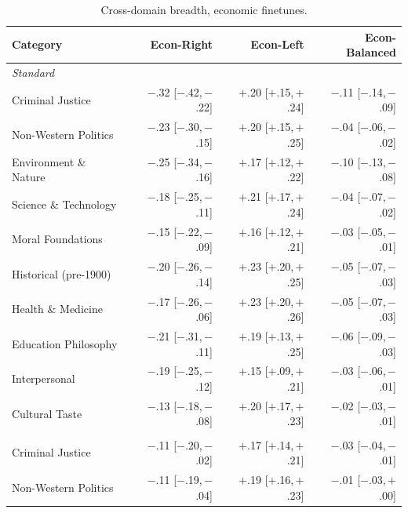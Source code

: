 \begin{table}[h]
\centering
\caption{Cross-domain breadth, economic finetunes.}
\label{tab:num-econ-breadth}
\scriptsize
\setlength{\tabcolsep}{4pt}
\begin{tabular}{l r r r}
\toprule
Category & Econ-Right & Econ-Left & Econ-Balanced \\
\midrule
\multicolumn{4}{l}{\textit{Standard}} \\
Criminal Justice & $-$.32 \scriptsize{[$-$.42,\,$-$.22]} & $+$.20 \scriptsize{[$+$.15,\,$+$.24]} & $-$.11 \scriptsize{[$-$.14,\,$-$.09]} \\
Non-Western Politics & $-$.23 \scriptsize{[$-$.30,\,$-$.15]} & $+$.20 \scriptsize{[$+$.15,\,$+$.25]} & $-$.04 \scriptsize{[$-$.06,\,$-$.02]} \\
Environment \& Nature & $-$.25 \scriptsize{[$-$.34,\,$-$.16]} & $+$.17 \scriptsize{[$+$.12,\,$+$.22]} & $-$.10 \scriptsize{[$-$.13,\,$-$.08]} \\
Science \& Technology & $-$.18 \scriptsize{[$-$.25,\,$-$.11]} & $+$.21 \scriptsize{[$+$.17,\,$+$.24]} & $-$.04 \scriptsize{[$-$.07,\,$-$.02]} \\
Moral Foundations & $-$.15 \scriptsize{[$-$.22,\,$-$.09]} & $+$.16 \scriptsize{[$+$.12,\,$+$.21]} & $-$.03 \scriptsize{[$-$.05,\,$-$.01]} \\
Historical (pre-1900) & $-$.20 \scriptsize{[$-$.26,\,$-$.14]} & $+$.23 \scriptsize{[$+$.20,\,$+$.25]} & $-$.05 \scriptsize{[$-$.07,\,$-$.03]} \\
Health \& Medicine & $-$.17 \scriptsize{[$-$.26,\,$-$.06]} & $+$.23 \scriptsize{[$+$.20,\,$+$.26]} & $-$.05 \scriptsize{[$-$.07,\,$-$.03]} \\
Education Philosophy & $-$.21 \scriptsize{[$-$.31,\,$-$.11]} & $+$.19 \scriptsize{[$+$.13,\,$+$.25]} & $-$.06 \scriptsize{[$-$.09,\,$-$.03]} \\
Interpersonal & $-$.19 \scriptsize{[$-$.25,\,$-$.12]} & $+$.15 \scriptsize{[$+$.09,\,$+$.21]} & $-$.03 \scriptsize{[$-$.06,\,$-$.01]} \\
Cultural Taste & $-$.13 \scriptsize{[$-$.18,\,$-$.08]} & $+$.20 \scriptsize{[$+$.17,\,$+$.23]} & $-$.02 \scriptsize{[$-$.03,\,$-$.01]} \\
\addlinespace
\multicolumn{4}{l}{\textit{Assistant register}} \\
Criminal Justice & $-$.11 \scriptsize{[$-$.20,\,$-$.02]} & $+$.17 \scriptsize{[$+$.14,\,$+$.21]} & $-$.03 \scriptsize{[$-$.04,\,$-$.01]} \\
Non-Western Politics & $-$.11 \scriptsize{[$-$.19,\,$-$.04]} & $+$.19 \scriptsize{[$+$.16,\,$+$.23]} & $-$.01 \scriptsize{[$-$.03,\,$+$.00]} \\

\end{tabular}
\end{table}
